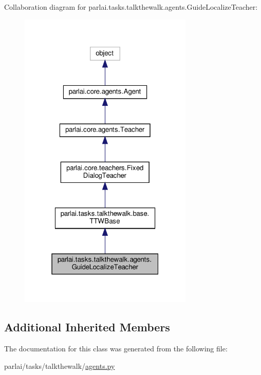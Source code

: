 Collaboration diagram for parlai.\+tasks.\+talkthewalk.\+agents.\+Guide\+Localize\+Teacher\+:
\nopagebreak
\begin{figure}[H]
\begin{center}
\leavevmode
\includegraphics[width=235pt]{classparlai_1_1tasks_1_1talkthewalk_1_1agents_1_1GuideLocalizeTeacher__coll__graph}
\end{center}
\end{figure}
\subsection*{Additional Inherited Members}


The documentation for this class was generated from the following file\+:\begin{DoxyCompactItemize}
\item 
parlai/tasks/talkthewalk/\hyperlink{parlai_2tasks_2talkthewalk_2agents_8py}{agents.\+py}\end{DoxyCompactItemize}
